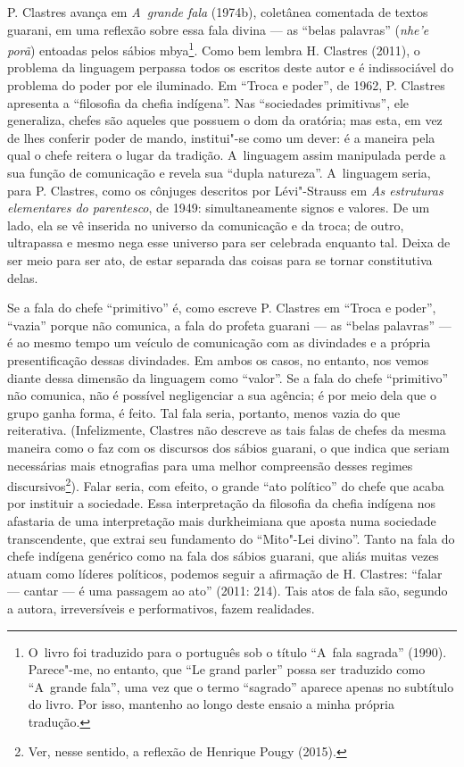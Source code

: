 P. Clastres avança em \emph{A~grande fala} (1974b), coletânea comentada de
textos guarani, em uma reflexão sobre essa fala divina --- as ``belas
palavras'' (\emph{nhe’e porã}) entoadas pelos sábios mbya\footnote{O~livro foi
traduzido para o português sob o título ``A~fala sagrada'' (1990).
Parece"-me, no entanto, que ``Le grand parler'' possa ser traduzido como
``A~grande fala'', uma vez que o termo ``sagrado'' aparece apenas no
subtítulo do livro. Por isso, mantenho ao longo deste ensaio a minha
própria tradução.}. Como bem lembra H. Clastres (2011), o problema da
linguagem perpassa todos os escritos deste autor e é indissociável do
problema do poder por ele iluminado. Em ``Troca e poder'', de 1962, P.
Clastres apresenta a ``filosofia da chefia indígena''. Nas ``sociedades
primitivas'', ele generaliza, chefes são aqueles que possuem o dom da
oratória; mas esta, em vez de lhes conferir poder de mando, institui"-se
como um dever: é a maneira pela qual o chefe reitera o lugar da
tradição. A~linguagem assim manipulada perde a sua função de
comunicação e revela sua ``dupla natureza''. A~linguagem seria, para P.
Clastres, como os cônjuges descritos por Lévi"-Strauss em \emph{As estruturas
elementares do parentesco}, de 1949: simultaneamente signos e valores.
De um lado, ela se vê inserida no universo da comunicação e da troca;
de outro, ultrapassa e mesmo nega esse universo para ser celebrada
enquanto tal. Deixa de ser meio para ser ato, de estar separada das
coisas para se tornar constitutiva delas. 

Se a fala do chefe ``primitivo'' é, como escreve P. Clastres em ``Troca e
poder'', ``vazia'' porque não comunica, a fala do profeta guarani --- as
``belas palavras'' --- é ao mesmo tempo um veículo de comunicação com as
divindades e a própria presentificação dessas divindades. Em ambos os
casos, no entanto, nos vemos diante dessa dimensão da linguagem como
``valor''. Se a fala do chefe ``primitivo'' não comunica, não é possível
negligenciar a sua agência; é por meio dela que o grupo ganha forma, é
feito. Tal fala seria, portanto, menos vazia do que reiterativa.
(Infelizmente, Clastres não descreve as tais falas de chefes da mesma
maneira como o faz com os discursos dos sábios guarani, o que indica
que seriam necessárias mais etnografias para uma melhor compreensão
desses regimes discursivos\footnote{Ver, nesse sentido, a reflexão de
Henrique Pougy (2015).}). Falar seria, com efeito, o grande ``ato
político'' do chefe que acaba por instituir a sociedade. Essa
interpretação da filosofia da chefia indígena nos afastaria de uma
interpretação mais durkheimiana que aposta numa sociedade
transcendente, que extrai seu fundamento do ``Mito"-Lei divino''. Tanto na
fala do chefe indígena genérico como na fala dos sábios guarani, que
aliás muitas vezes atuam como líderes políticos, podemos seguir a
afirmação de H. Clastres: ``falar --- cantar --- é uma passagem ao ato''
(2011: 214). Tais atos de fala são, segundo a autora, irreversíveis e
performativos, fazem realidades. 

